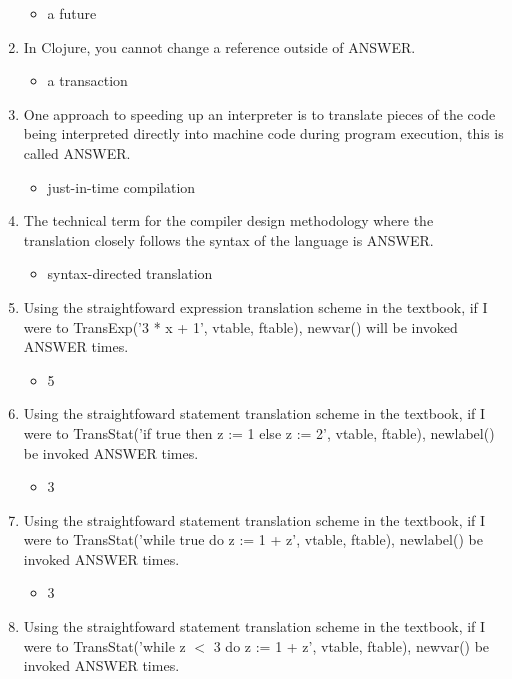 \documentclass{exam}
\begin{document}
\begin{enumerate}
\begin{itemize}
\item a future
\end{itemize}
\item In Clojure, you cannot change a reference outside of ANSWER.
\begin{itemize}
\item a transaction
\end{itemize}
\item One approach to speeding up an interpreter is to translate pieces of the code being interpreted directly into machine code during program execution, this is called ANSWER.
\begin{itemize}
\item just-in-time compilation
\end{itemize}
\item The technical term for the compiler design methodology where the translation closely follows the syntax of the language is ANSWER.
\begin{itemize}
\item syntax-directed translation
\end{itemize}
\item Using the straightfoward expression translation scheme in the textbook, if I were to TransExp('3 * x + 1', vtable, ftable), newvar() will be invoked ANSWER times.
\begin{itemize}
\item 5
\end{itemize}
\item Using the straightfoward statement translation scheme in the textbook, if I were to TransStat('if true then z := 1 else z := 2', vtable, ftable), newlabel() be invoked ANSWER times.
\begin{itemize}
\item 3
\end{itemize}
\item Using the straightfoward statement translation scheme in the textbook, if I were to TransStat('while true do z := 1 + z', vtable, ftable), newlabel() be invoked ANSWER times.
\begin{itemize}
\item 3
\end{itemize}
\item Using the straightfoward statement translation scheme in the textbook, if I were to TransStat('while z $<$ 3 do z := 1 + z', vtable, ftable), newvar() be invoked ANSWER times.
\begin{itemize}

\end{itemize}
\end{enumerate}
\end{document}
